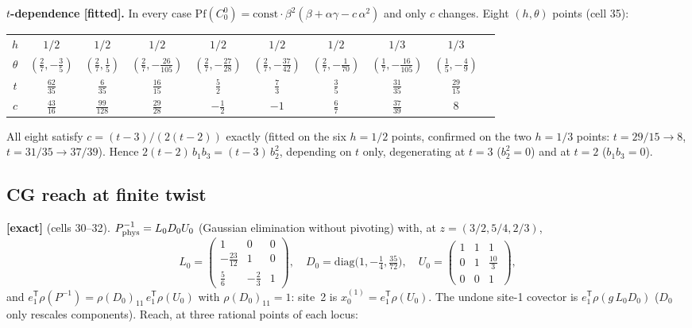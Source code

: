 \documentclass[10pt]{article}
\newcommand{\Pf}{\mathrm{Pf}}
\begin{document}
\textbf{$t$-dependence [fitted].} In every case $\Pf(C^0_0)=\mathrm{const}\cdot\beta^2(\beta+\alpha\gamma-c\,\alpha^2)$ and only $c$ changes. Eight $(h,\theta)$ points (cell 35):
\begin{center}\small\setlength{\tabcolsep}{4pt}\begin{tabular}{@{}cccccccccc@{}}\toprule
$h$ & $1/2$ & $1/2$ & $1/2$ & $1/2$ & $1/2$ & $1/2$ & $1/3$ & $1/3$ \\
$\theta$ & $(\tfrac27,-\tfrac35)$ & $(\tfrac27,\tfrac15)$ & $(\tfrac27,-\tfrac{26}{105})$ & $(\tfrac27,-\tfrac{27}{28})$ & $(\tfrac27,-\tfrac{37}{42})$ & $(\tfrac27,-\tfrac1{70})$ & $(\tfrac17,-\tfrac{16}{105})$ & $(\tfrac15,-\tfrac49)$ \\
$t$ & $\tfrac{62}{35}$ & $\tfrac6{35}$ & $\tfrac{16}{15}$ & $\tfrac52$ & $\tfrac73$ & $\tfrac35$ & $\tfrac{31}{35}$ & $\tfrac{29}{15}$ \\
$c$ & $\tfrac{43}{16}$ & $\tfrac{99}{128}$ & $\tfrac{29}{28}$ & $-\tfrac12$ & $-1$ & $\tfrac67$ & $\tfrac{37}{39}$ & $8$ \\
\bottomrule\end{tabular}\end{center}
All eight satisfy $c=(t-3)/(2(t-2))$ exactly (fitted on the six $h=1/2$ points, confirmed on the two $h=1/3$ points: $t=29/15\to8$, $t=31/35\to37/39$). Hence $2(t-2)\,b_1b_3=(t-3)\,b_2^2$, depending on $t$ only, degenerating at $t=3$ ($b_2^2=0$) and at $t=2$ ($b_1b_3=0$).

\subsection{CG reach at finite twist}\label{sec:adjreach}

\textbf{[exact]} (cells 30--32). $P_{\rm phys}^{-1}=L_0D_0U_0$ (Gaussian elimination without pivoting) with, at $z=(3/2,5/4,2/3)$,
\[
L_0=\begin{pmatrix}1&0&0\\-\tfrac{23}{12}&1&0\\\tfrac56&-\tfrac23&1\end{pmatrix},\quad D_0=\mathrm{diag}\bigl(1,-\tfrac14,\tfrac{35}{72}\bigr),\quad U_0=\begin{pmatrix}1&1&1\\0&1&\tfrac{10}3\\0&0&1\end{pmatrix},
\]
and $e_1^{\mathsf T}\rho(P^{-1})=\rho(D_0)_{11}\,e_1^{\mathsf T}\rho(U_0)$ with $\rho(D_0)_{11}=1$: site~2 is $x_0^{(1)}=e_1^{\mathsf T}\rho(U_0)$. The undone site-1 covector is $e_1^{\mathsf T}\rho(g\,L_0D_0)$ ($D_0$ only rescales components). Reach, at three rational points of each locus:
\end{document}
